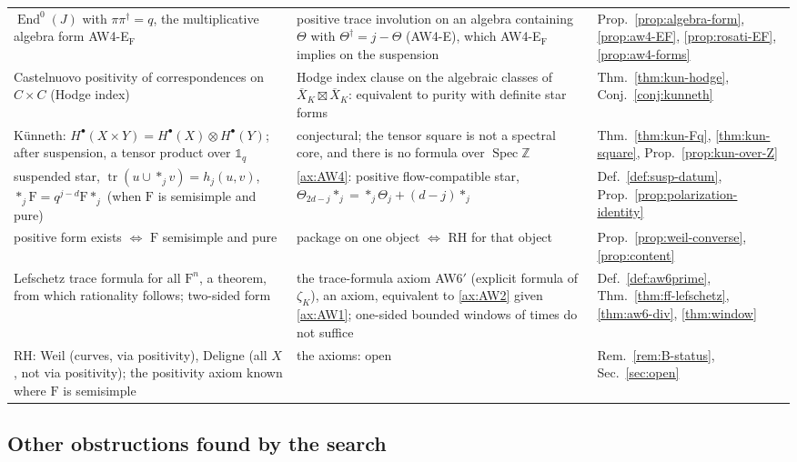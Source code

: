 \documentclass[11pt]{amsart}
\theoremstyle{plain}
\theoremstyle{definition}
\theoremstyle{remark}
\numberwithin{equation}{section}
\newcommand{\Z}{\mathbb{Z}}
\newcommand{\Xbar}{\overline{X}}
\DeclareMathOperator{\Spec}{Spec}
\begin{document}
{\begin{longtable}{@{}>{\raggedright\arraybackslash}p{}
>{\raggedright\arraybackslash}p{}
>{\raggedright\arraybackslash}p{}@{}}
$\operatorname{End}^0(J)$ with $\pi\pi^\dagger=q$, the multiplicative
algebra form AW4-E$_{\mathrm F}$ & positive trace involution on an
algebra containing $\Theta$ with $\Theta^\dagger=j-\Theta$
(AW4-E), which AW4-E$_{\mathrm F}$ implies on the suspension &
Prop.~\ref{prop:algebra-form}, \ref{prop:aw4-EF}, \ref{prop:rosati-EF},
\ref{prop:aw4-forms}\\
Castelnuovo positivity of correspondences on $C\times C$ (Hodge index)
& Hodge index clause on the algebraic classes of
$\Xbar_K\boxtimes\Xbar_K$: equivalent to purity with definite star
forms & Thm.~\ref{thm:kun-hodge}, Conj.~\ref{conj:kunneth}\\
K\"unneth: $H^\bullet(X\times Y)=H^\bullet(X)\otimes H^\bullet(Y)$;
after suspension, a tensor product over $\mathbb 1_q$ & conjectural;
the tensor square is not a spectral core, and there is no formula over
$\Spec\Z$ & Thm.~\ref{thm:kun-Fq}, \ref{thm:kun-square},
Prop.~\ref{prop:kun-over-Z}\\
suspended star, $\operatorname{tr}(u\cup*_jv)=h_j(u,v)$,
$*_j\mathrm{F}=q^{j-d}\mathrm{F}*_j$ (when $\mathrm{F}$ is semisimple
and pure) & \ref{ax:AW4}: positive flow-compatible star,
$\Theta_{2d-j}*_j=*_j\Theta_j+(d-j)*_j$ & Def.~\ref{def:susp-datum},
Prop.~\ref{prop:polarization-identity}\\
positive form exists $\Leftrightarrow$ $\mathrm{F}$ semisimple and pure
& package on one object $\Leftrightarrow$ RH for that object &
Prop.~\ref{prop:weil-converse}, \ref{prop:content}\\
Lefschetz trace formula for all $\mathrm F^n$, a theorem, from which
rationality follows; two-sided form & the trace-formula axiom AW6$'$
(explicit formula of $\zeta_K$), an axiom, equivalent to \ref{ax:AW2}
given \ref{ax:AW1}; one-sided bounded windows of times do not
suffice &
Def.~\ref{def:aw6prime}, Thm.~\ref{thm:ff-lefschetz},
\ref{thm:aw6-div}, \ref{thm:window}\\
RH: Weil (curves, via positivity), Deligne (all $X$, not via
positivity); the positivity axiom known where $\mathrm{F}$ is semisimple
& the axioms: open & Rem.~\ref{rem:B-status}, Sec.~\ref{sec:open}\\
\end{longtable}
}

\subsection{Other obstructions found by the search}
\end{document}
